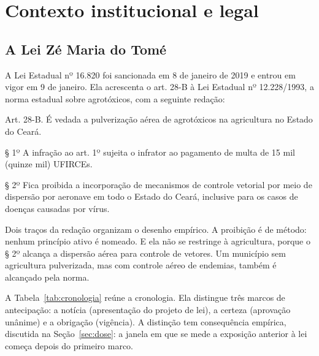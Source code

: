 
\chapter{Contexto institucional e legal}
\label{cap:contexto}

\section{A Lei Zé Maria do Tomé}
\label{sec:lei}

A Lei Estadual nº 16.820 foi sancionada em 8 de janeiro de 2019 e entrou em
vigor em 9 de janeiro. Ela acrescenta o art. 28-B à Lei Estadual nº
12.228/1993, a norma estadual sobre agrotóxicos, com a seguinte redação:

\begin{citacao}
Art. 28-B. É vedada a pulverização aérea de agrotóxicos na agricultura no
Estado do Ceará.

§ 1º A infração ao art. 1º sujeita o infrator ao pagamento de multa de 15 mil
(quinze mil) UFIRCEs.

§ 2º Fica proibida a incorporação de mecanismos de controle vetorial por meio
de dispersão por aeronave em todo o Estado do Ceará, inclusive para os casos de
doenças causadas por vírus.
\end{citacao}

Dois traços da redação organizam o desenho empírico. A proibição é de método:
nenhum princípio ativo é nomeado. E ela não se restringe à agricultura, porque
o § 2º alcança a dispersão aérea para controle de vetores. Um município sem
agricultura pulverizada, mas com controle aéreo de endemias, também é alcançado
pela norma.

A Tabela~\ref{tab:cronologia} reúne a cronologia. Ela distingue três marcos de
antecipação: a notícia (apresentação do projeto de lei), a certeza (aprovação
unânime) e a obrigação (vigência). A distinção tem consequência empírica,
discutida na Seção~\ref{sec:dose}: a janela em que se mede a exposição anterior
à lei começa depois do primeiro marco.

